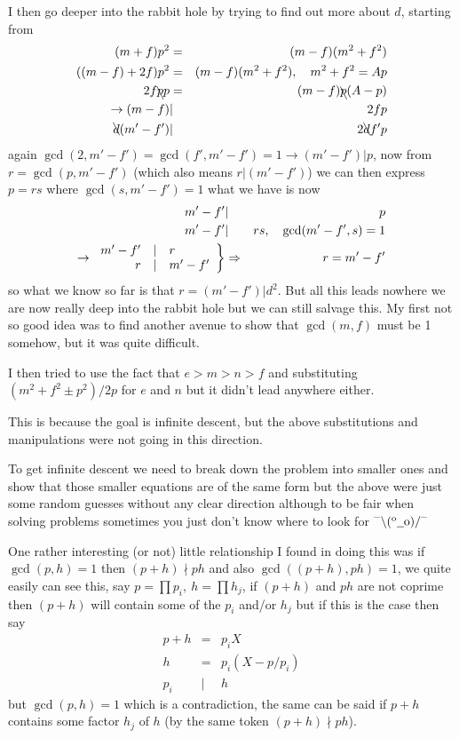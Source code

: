 \documentclass[aps,preprint,preprintnumbers,nofootinbib,showpacs,prd]{revtex4-1}
\newcommand{\nbea}{\begin{eqnarray*}}
\newcommand{\neea}{\end{eqnarray*}}
\newcommand{\dunno}{$ {}^{\mbox {--}}\backslash(^{\rm o}{}\underline{\hspace{0.2cm}}{\rm o})/^{\mbox {--}}$}
\begin{document}
I then go deeper into the rabbit hole by trying to find out more about $d$, starting from
%
\nbea
(m + f)p^2 & = & (m-f)(m^2+f^2) \\
((m - f) + 2f)p^2 & = & (m-f)(m^2+f^2), ~~~ m^2 + f^2 = Ap \\
2f\bcancel{p}p & = & (m-f)\bcancel{p}(A - p) \\
\to (m-f) &|& 2fp \\
\bcancel{d}(m'-f') &|& 2\bcancel{d}f'p
\neea
%
again $\gcd(2,m'-f') = \gcd(f',m'-f') = 1 \to (m'-f') | p$, now from $r = \gcd(p, m'-f')$ (which also means $r|(m'-f')$) we can then express $p = rs$ where $\gcd(s, m'-f')=1$ what we have is now
%
\nbea
m'-f' &|& p \\
m'-f' &|& rs, ~~~ \gcd(m'-f',s)=1 \\
\to
\left. \begin{array}{r c l}
m'-f' &|& r \\
r &|& m'-f'
\end{array} \right \} &\Rightarrow & r = m' - f'
\neea
%
so what we know so far is that $r = (m' - f') | d^2$. But all this leads nowhere we are now really deep into the rabbit hole but we can still salvage this. My first not so good idea was to find another avenue to show that $\gcd(m,f)$ must be 1 somehow, but it was quite difficult.

I then tried to use the fact that $e > m > n > f$ and substituting $(m^2 + f^2 \pm p^2)/2p$ for $e$ and $n$ but it didn't lead anywhere either. 

This is because the goal is infinite descent, but the above substitutions and manipulations were not going in this direction.

To get infinite descent we need to break down the problem into smaller ones and show that those smaller equations are of the same form but the above were just some random guesses without any clear direction although to be fair when solving problems sometimes you just don't know where to look for \dunno

One rather interesting (or not) little relationship I found in doing this was if $\gcd(p,h) = 1$ then $(p+h)\nmid ph$ and also $\gcd((p+h), ph)=1$, we quite easily can see this, say $p = \prod p_i,~h = \prod h_j$, if $(p+h)$ and $ph$ are not coprime then $(p+h)$ will contain some of the $p_i$ and/or $h_j$ but if this is the case then say
%
\nbea
p + h & = & p_i X \\
h & = & p_i (X - p/p_i) \\
p_i &|& h
\neea
%
but $\gcd(p,h) = 1$ which is a contradiction, the same can be said if $p+h$ contains some factor $h_j$ of $h$ (by the same token $(p+h)\nmid ph$).
\end{document}
